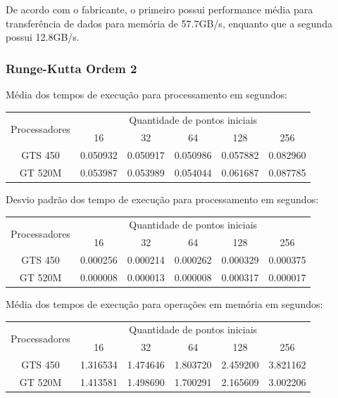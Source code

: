   De acordo com o fabricante, o primeiro possui performance média para transferência de dados para memória de 57.7GB/s, enquanto que a segunda possui 12.8GB/s.
    \subsubsection{Runge-Kutta Ordem 2}
    Média dos tempos de execução para processamento em segundos:\\
    \begin{tabular}{| c | c | c | c | c | c |}
      \hline
      \multirow{2}{*}{Processadores}& \multicolumn{5}{|c|}{Quantidade de pontos iniciais} \\ \cline{2-6}
      & 16 & 32 & 64 & 128 & 256 \\ \hline
      GTS 450 & 0.050932 & 0.050917 & 0.050986 & 0.057882 & 0.082960 \\ \hline
      GT 520M & 0.053987 & 0.053989 & 0.054044 & 0.061687 & 0.087785\\ \hline

      \hline
    \end{tabular}
    
    \hspace{1mm}\newline
    
    \noindent Desvio padrão dos tempo de execução para processamento em segundos:\\
    \begin{tabular}{| c | c | c | c | c | c |}
      \hline
      \multirow{2}{*}{Processadores}& \multicolumn{5}{|c|}{Quantidade de pontos iniciais} \\ \cline{2-6}
      & 16 & 32 & 64 & 128 & 256 \\ \hline
      GTS 450 & 0.000256 & 0.000214 & 0.000262 & 0.000329 & 0.000375 \\ \hline
      GT 520M & 0.000008 & 0.000013 & 0.000008 & 0.000317 & 0.000017 \\ \hline

      \hline
    \end{tabular}
    
    \hspace{1mm}\newline
    
    \noindent Média dos tempos de execução para operações em memória em segundos:\\
    \begin{tabular}{| c | c | c | c | c | c |}
      \hline
      \multirow{2}{*}{Processadores}& \multicolumn{5}{|c|}{Quantidade de pontos iniciais} \\ \cline{2-6}
      & 16 & 32 & 64 & 128 & 256 \\ \hline
      GTS 450 & 1.316534 & 1.474646 & 1.803720 & 2.459200 & 3.821162 \\ \hline
      GT 520M & 1.413581 & 1.498690 & 1.700291 & 2.165609 & 3.002206\\ \hline

      \hline
    \end{tabular}
    
